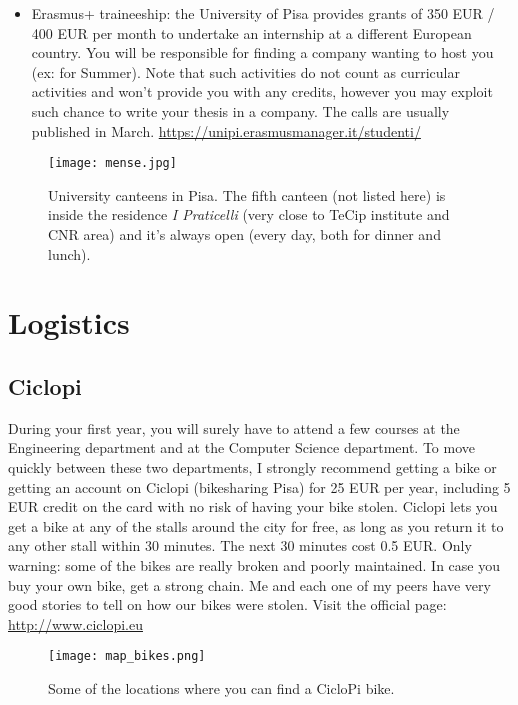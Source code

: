 \documentclass[11pt,fleqn,oneside]{book} %
\begin{document}
\begin{itemize}
\item Erasmus+ traineeship: the University of Pisa provides grants of 350 EUR / 400 EUR per month to undertake an internship at a different European country. You will be responsible for finding a company wanting to host you (ex: for Summer). Note that such activities do not count as curricular activities and won’t provide you with any credits, however you may exploit such chance to write your thesis in a company. The calls are usually published in March. 
\url{https://unipi.erasmusmanager.it/studenti/}
\end{itemize}

\begin{figure}[h]
  \centering\texttt{[image: mense.jpg]}\label{fig:mense}
  \caption{University canteens in Pisa. The fifth canteen (not listed here) is inside the residence \textit{I Praticelli} (very close to TeCip institute and CNR area) and it's always open (every day, both for dinner and lunch).}
\end{figure}



\chapter{Logistics}


\section{Ciclopi}
During your first year, you will surely have to attend a few courses at the Engineering department and at the Computer Science department. To move quickly between these two departments, I strongly recommend getting a bike or getting an account on Ciclopi (bikesharing Pisa) for 25 EUR per year, including 5 EUR credit on the card with no risk of having your bike stolen. Ciclopi lets you get a bike at any of the stalls around the city for free, as long as you return it to any other stall within 30 minutes. The next 30 minutes cost 0.5 EUR. Only warning: some of the bikes are really broken and poorly maintained. In case you buy your own bike, get a strong chain. Me and each one of my peers have very good stories to tell on how our bikes were stolen. 
Visit the official page: \url{http://www.ciclopi.eu}
\begin{figure}[h]
  \centering\texttt{[image: map\_bikes.png]}
  \caption{Some of the locations where you can find a CicloPi bike.}
\end{figure}
\end{document}
